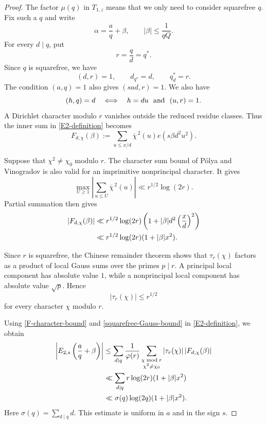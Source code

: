 \documentclass[12pt,reqno]{amsart}
\numberwithin{equation}{section}
\theoremstyle{plain}
\theoremstyle{remark}
\begin{document}
\begin{proof}
The factor $\mu(q)$ in $T_{1,z}$ means that we only need to consider squarefree $q$.
Fix such a $q$ and write
\[
 \alpha=\frac aq+\beta,
 \qquad
 |\beta|\leq\frac1{qQ}.
\]
For every $d\mid q$, put
\[
 r=\frac qd=q^*.
\]
Since $q$ is squarefree, we have
\[
 (d,r)=1,\qquad
 d_{q^*}=d,\qquad
 q^*_{d}=r.
\]
The condition $(a,q)=1$ also gives $(sad,r)=1$.
We also have
\[
 (h,q)=d
 \quad\Longleftrightarrow\quad
 h=du\ \hbox{ and }\ (u,r)=1.
\]
A Dirichlet character modulo $r$ vanishes outside the reduced residue classes.
Thus the inner sum in \eqref{E2-definition} becomes
\[
 F_{d,\chi}(\beta)
 :=
 \sum_{u\leq x/d}
 \overline{\chi}^{\,2}(u)e(s\beta d^2u^2).
\]

Suppose that $\chi^2\ne\chi_0$ modulo $r$.
The character sum bound of P\'olya and Vinogradov is also valid for an
imprimitive nonprincipal character.
It gives
\[
 \max_{U\geq1}
 \left|\sum_{u\leq U}\overline{\chi}^{\,2}(u)\right|
 \ll r^{1/2}\log(2r).
\]
Partial summation then gives
\begin{align}
 |F_{d,\chi}(\beta)|
 &\ll r^{1/2}\log(2r)
 \left(1+|\beta|d^2\left(\frac xd\right)^2\right)\notag\\
 &\ll r^{1/2}\log(2r)(1+|\beta|x^2).
\label{F-character-bound}
\end{align}

Since $r$ is squarefree, the Chinese remainder theorem shows that
$\tau_r(\chi)$ factors as a product of local Gauss sums over the primes
$p\mid r$.
A principal local component has absolute value $1$, while a
nonprincipal local component has absolute value $\sqrt p$.
Hence
\begin{equation}\label{squarefree-Gauss-bound}
 |\tau_r(\chi)|\leq r^{1/2}
\end{equation}
for every character $\chi$ modulo $r$.

Using \eqref{F-character-bound} and
\eqref{squarefree-Gauss-bound} in \eqref{E2-definition}, we obtain
\begin{align}
 \left|E_{2,s}\left(\frac aq+\beta\right)\right|
 &\leq
 \sum_{d\mid q}\frac1{\varphi(r)}
 \sum_{\substack{\chi\bmod r\\\chi^2\ne\chi_0}}
 |\tau_r(\chi)|\,|F_{d,\chi}(\beta)|\notag\\
 &\ll
 \sum_{d\mid q}r\log(2r)(1+|\beta|x^2)\notag\\
 &\ll
 \sigma(q)\log(2q)(1+|\beta|x^2).
    \label{E2-pointwise}
\end{align}
Here $\sigma(q)=\sum_{d\mid q}d$.
This estimate is uniform in $a$ and in the sign $s$.


\end{proof}
\end{document}
